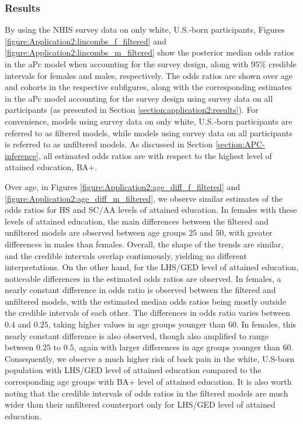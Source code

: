 \subsubsection{Results}
\label{section:application2:extension:results}
\vspace{-0.2cm}
By using the NHIS survey data on only white, U.S.-born participants, Figures \ref{figure:Application2:lincombs_f_filtered} and \ref{figure:Application2:lincombs_m_filtered} show the posterior median odds ratios in the aPc model when accounting for the survey design, along with $95\%$ credible intervals for females and males, respectively. The odds ratios are shown over age and cohorts in the respective subfigures, along with the corresponding estimates in the aPc model accounting for the survey design using survey data on all participants (as presented in Section \ref{section:application2:results}). For convenience, models using survey data on only white, U.S.-born participants are referred to as filtered models, while models using survey data on all participants is referred to as unfiltered models. As discussed in Section \ref{section:APC-inference}, all estimated odds ratios are with respect to the highest level of attained education, BA+. 

\vspace{-0.2cm}
Over age, in Figures \ref{figure:Application2:age_diff_f_filtered} and \ref{figure:Application2:age_diff_m_filtered}, we observe similar estimates of the odds ratios for HS and SC/AA levels of attained education. In females with these levels of attained education, the main differences between the filtered and unfiltered models are observed between age groups $25$ and $50$, with greater differences in males than females. Overall, the shape of the trends are similar, and the credible intervals overlap continuously, yielding no different interpretations. On the other hand, for the LHS/GED level of attained education, noticeable differences in the estimated odds ratios are observed. In females, a nearly constant difference in odds ratio is observed between the filtered and unfiltered models, with the estimated median odds ratios being mostly outside the credible intervals of each other. The differences in odds ratio varies between $0.4$ and $0.25$, taking higher values in age groups younger than $60$. In females, this nearly constant difference is also observed, though also amplified to range between $0.25$ to $0.5$, again with larger differences in age groups younger than $60$. Consequently, we observe a much higher risk of back pain in the white, U.S-born population with LHS/GED level of attained education compared to the corresponding age groups with BA+ level of attained education. It is also worth noting that the credible intervals of odds ratios in the filtered models are much wider than their unfiltered counterpart only for LHS/GED level of attained education. 

